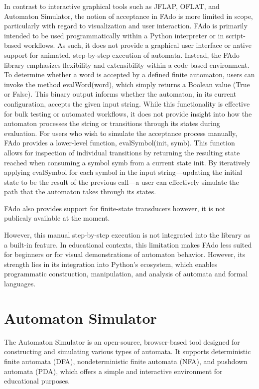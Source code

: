 In contrast to interactive graphical tools such as JFLAP, OFLAT, and Automaton Simulator, the notion of acceptance in FAdo is more limited in scope, 
particularly with regard to visualization and user interaction. 
FAdo is primarily intended to be used programmatically within a Python interpreter or in script-based workflows. 
As such, it does not provide a graphical user interface or native support for animated, step-by-step execution of automata.
Instead, the FAdo library emphasizes flexibility and extensibility within a code-based environment. 
To determine whether a word is accepted by a defined finite automaton, users can invoke the method evalWord(word), 
which simply returns a Boolean value (True or False). 
This binary output informs whether the automaton, in its current configuration, accepts the given input string. 
While this functionality is effective for bulk testing or automated workflows, 
it does not provide insight into how the automaton processes the string or transitions through its states during evaluation.
For users who wish to simulate the acceptance process manually, FAdo provides a lower-level function, evalSymbol(init, symb). 
This function allows for inspection of individual transitions by returning the resulting state reached when consuming a symbol symb from a current state init. 
By iteratively applying evalSymbol for each symbol in the input string—updating 
the initial state to be the result of the previous call—a user can effectively simulate the path that the automaton takes through its states.

FAdo also provides support for finite-state transducers however, it is not publicaly available at the moment.\cite{konstantinidis2016code}

However, this manual step-by-step execution is not integrated into the library as a built-in feature.
In educational contexts, this limitation makes FAdo less suited for beginners or for visual demonstrations of automaton behavior. 
However, its strength lies in its integration into Python's ecosystem, which enables programmatic construction, manipulation, and analysis of automata and formal languages.

\section{Automaton Simulator}

The Automaton Simulator\cite{automatonSimulator} is an open-source, browser-based tool designed for constructing and simulating various types of automata. 
It supports deterministic finite automata (DFA), nondeterministic finite automata (NFA), and pushdown automata (PDA), 
which offers a simple and interactive environment for educational purposes.


